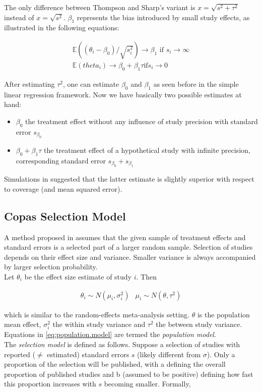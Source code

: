 \documentclass[11pt,a4paper,twoside]{book}\usepackage[]{graphicx}\usepackage[]{color}
\begin{document}
The only difference between Thompson and Sharp's variant is $x = \sqrt{s^2 + \tau^2}$ instead of $x = \sqrt{s^2}$. $\beta_{1}$ represents the bias introduced by small study effects, as illustrated in the following equations:

\begin{align}
\mathbb{E}((\theta_i - \beta_0)/\sqrt{s_i^2}) \rightarrow \beta_1 \textrm{ if } s_i \rightarrow \infty \nonumber \\ %
\mathbb{E}(theta_i) \rightarrow \beta_0 + \beta_1 \tau \textrm{if} s_i \rightarrow 0 \nonumber
\end{align}

After estimating $\tau^2$, one can estimate $\beta_{0}$ and $\beta_{1}$ as seen before in the simple linear regression framework. Now we have basically two possible estimates at hand:
\begin{itemize}
\item $\beta_0$ the treatment effect without any influence of study precision with standard error $s_{\beta_0}$
\item $\beta_0 + \beta_1 \tau$ the treatment effect of a hypothetical study with infinite precision, corresponding standard error $s_{\beta_0} + s_{\beta_1}$
\end{itemize}

Simulations in \citet{limitmeta} suggested that the latter estimate is slightly superior with respect to coverage (and mean squared error).



\subsection{Copas Selection Model}

A method proposed in \cite{Copas1,Copas2,Copas3} 
assumes that the given sample of treatment effects and standard errors is a selected part of a larger random sample. Selection of studies depends on their effect size and variance. Smaller variance is always accompanied by larger selection probability. \\
Let $\theta_i$ be the effect size estimate of study $i$. Then 

\begin{align}
\theta_i \sim N(\mu_i, \sigma_i^2) &
\mu_i \sim N(\theta, \tau^2) \label{eq:population.model}
\end{align}

which is similar to the random-effects meta-analysis setting. $\theta$ is the population mean effect, $\sigma_i^2$ the within study variance and $\tau^2$ the between study variance. Equations in \ref{eq:population.model} are termed the \textit{population model}. \\
The \textit{selection model} is defined as follows. Suppose a selection of studies with reported ($\neq$ estimated) standard errors $s$ (likely different from $\sigma$). Only a proportion of the selection will be published, with a defining the overall proportion of published studies and b (assumed to be positive) defining how fast this proportion increases with $s$ becoming smaller. Formally,
\end{document}
